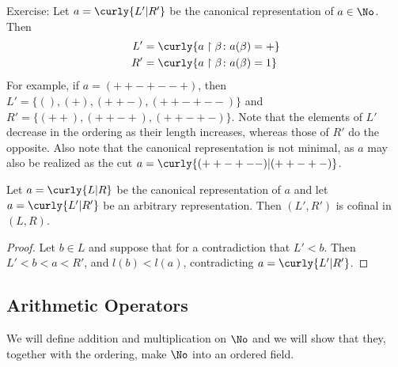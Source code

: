 Exercise: Let $a = \curly{L' \vert R'}$ be the canonical representation 
of $a \in \No$. Then 
\begin{align*}
	L' &= \curly{a \restriction \beta \colon a(\beta) = +} \\
	R' &= \curly{a \restriction \beta \colon a(\beta) = 1}
\end{align*}
For example, if $a = (++-+--+)$, then $L' = \{(), (+), (++-), (++-+--)\}$
and $R' = \{(++), (++-+), (++-+-)\}$. Note that the elements of 
$L'$ decrease in the ordering as their length increases, whereas those 
of $R'$ do the opposite. Also note that the canonical representation 
is not minimal, as $a$ may also be realized as the cut 
$a = \curly{(++-+--) \vert (++-+-)}$. 
\begin{cor}
	Let $a = \curly{L \vert R}$ be the canonical representation 
	of $a$ and let $a = \curly{L' \vert R'}$ be an arbitrary 
	representation. Then $(L', R')$ is cofinal in $(L, R)$. 
	\label{inverse_cofinality_theorem}
\end{cor}
\begin{proof}
	Let $b \in L$ and suppose that for a contradiction that 
	$L' < b$. Then $L' < b < a < R'$, and $l(b) < l(a)$, 
	contradicting $a = \curly{L' \vert R'}$. 
\end{proof}
\subsection*{Arithmetic Operators}
We will define addition and multiplication on $\No$ and we will 
show that they, together with the ordering, make $\No$ into 
an ordered field. 
